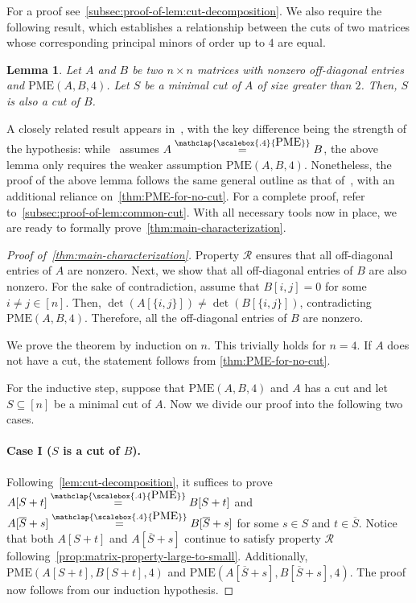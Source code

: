 \documentclass[11pt,letterpaper]{article}
\newcommand{\comp}[1]{\overline{#1}}
\newcommand{\F}{\mathbb{F}}
\newtheorem{theorem}{Theorem}[section]
\newtheorem{lemma}{Lemma}[section]
\newcommand{\PME}{\stackrel{\mathclap{\scalebox{.4}{\mbox{PME}}}}{=}}
\newcommand{\kPME}[3]{\mathrm{PME}(#1, #2, #3)}
\newcommand{\prop}{\mathcal{R}}
\begin{document}
{{{For a proof see~\cref{subsec:proof-of-lem:cut-decomposition}. We also require the following result, which establishes a relationship between the cuts of two matrices whose corresponding principal minors of order up to 4 are equal.

\begin{lemma}
\label{lem:common-cut}
Let $A$ and $B$ be two $n \times n$ matrices with nonzero off-diagonal entries and $\kPME{A}{B}{4}$. Let $S$ be a minimal cut of $A$ of size greater than $2$. Then, $S$ is also a cut of $B$.
\end{lemma}

A closely related result appears in~\cite[Lemma~3.6]{Chatterjee25}, with the key difference being the strength of the hypothesis: while~\cite{Chatterjee25} assumes $A \PME B$, the above lemma only requires the weaker assumption $\kPME{A}{B}{4}$. Nonetheless, the proof of the above lemma follows the same general outline as that of~\cite[Lemma~3.6]{Chatterjee25}, with an additional reliance on~\cref{thm:PME-for-no-cut}. For a complete proof, refer to~\cref{subsec:proof-of-lem:common-cut}. With all necessary tools now in place, we are ready to formally prove~\cref{thm:main-characterization}.


\begin{proof}[Proof of~\cref{thm:main-characterization}]
Property $\prop$ ensures that all off-diagonal entries of $A$ are nonzero. Next, we show that all off-diagonal entries of $B$ are also nonzero. For the sake of contradiction, assume that $B[i,j]= 0$ for some $i\neq j\in[n]$. Then, $\det(A[\{i,j\}])\neq \det(B[\{i,j\}])$, contradicting $\kPME{A}{B}{4}$. Therefore, all the off-diagonal entries of $B$ are nonzero.

We prove the theorem by induction on $n$. 
This trivially holds for $n = 4$. If $A$ does not have a cut, the statement follows from \cref{thm:PME-for-no-cut}.
    
For the inductive step, suppose that $\kPME{A}{B}{4}$ and $A$ has a cut and let $S\subseteq [n]$ be a minimal cut of $A$. Now we divide our proof into the following two cases.

\paragraph*{Case I ($S$ is a cut of $B$).} Following~\cref{lem:cut-decomposition}, it suffices to prove $A[S+t] \PME B[S+t]$ and $A[\comp{S} + s] \PME B[\comp{S} + s]$ for some $s\in S$ and $t\in \comp{S}$. Notice that both $A[S+t]$ and $A[\comp{S}+s]$ continue to satisfy property $\prop$ following~\cref{prop:matrix-property-large-to-small}. Additionally, $\kPME{A[S+t]}{B[S+t]}{4}$ and $\kPME{A[\comp{S}+s]}{B[\comp{S}+s]}{4}$. The proof now follows from our induction hypothesis.


\end{proof}}}}
\end{document}
